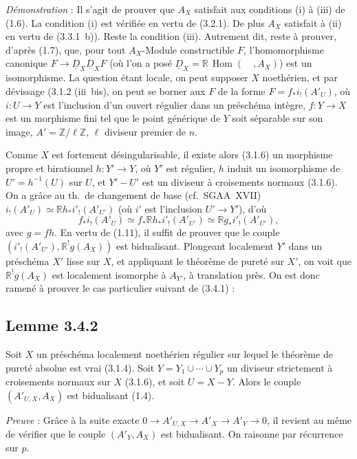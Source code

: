 \documentclass[11pt]{article}
\DeclareMathOperator{\Hom}{Hom}
\newcommand{\R}{\mathbb{R}}\newcommand{\RHomCore}{\mathbb{R}\mathrm{Hom}}
\newcommand{\Z}{\mathbb{Z}}
\providecommand{\Hom}{\operatorname{Hom}}
\providecommand{\R}{\mathrm R}
\providecommand{\Z}{\mathbb Z}
\providecommand{\Hom}{\operatorname{Hom}}
\begin{document}
\emph{Démonstration} : Il s'agit de prouver que $A_X$ satisfait aux conditions (i) à (iii) de (1.6). La condition (i) est vérifiée en vertu de (3.2.1). De plus $A_X$ satisfait à (ii) en vertu de (3.3.1~b)). Reste la condition (iii). Autrement dit, reste à prouver, d'après (1.7), que, pour tout $A_X$-Module constructible $F$, l'homomorphisme canonique $F \to \underline{D}_X \underline{D}_X F$ (où l'on a posé $\underline{D}_X = \R\,\Hom(\quad, A_X)$) est un isomorphisme. La question étant locale, on peut supposer $X$ noethérien, et par dévissage (3.1.2 (iii~bis), on peut se borner aux $F$ de la forme $F = f_{*}i_{!}(A'_U)$, où $i : U \to Y$ est l'inclusion d'un ouvert régulier dans un préschéma intègre, $f : Y \to X$ est un morphisme fini tel que le point générique de $Y$ soit séparable sur son image, $A' = \Z/\ell\Z$, $\ell$ diviseur premier de $n$.

Comme $X$ est fortement désingularisable, il existe alors (3.1.6) un morphisme propre et birationnel $h : Y' \to Y$, où $Y'$ est régulier, $h$ induit un isomorphisme de $U' = h^{-1}(U)$ sur $U$, et $Y' - U'$ est un diviseur à croisements normaux (3.1.6). On a grâce au th.~de changement de base (cf.~SGAA~XVII) $i_{!}(A'_U) \simeq \R h_{*} i'_{!}(A'_{U'})$ (où $i'$ est l'inclusion $U' \to Y'$), d'où
\[
f_{*} i_{!}(A'_U) \simeq f_{*} \R h_{*} i'_{!}(A'_{U'}) \simeq \R g_{*} i'_{!}(A'_{U'}),
\]
avec $g = fh$. En vertu de (1.11), il suffit de prouver que le couple 
$(i'_{!}(A'_{U'}), \R^{!}g(A_X))$ est
bidualisant. Plongeant localement $Y'$ dans un préschéma $X'$ lisse sur $X$, et appliquant le théorème de pureté sur $X'$, on voit que $\R^{!}g(A_X)$ est localement isomorphe à $A_{Y'}$, à translation près. On est donc ramené à prouver le cas particulier suivant de (3.4.1) :

\subsection*{Lemme 3.4.2}
Soit $X$ un préschéma localement noethérien régulier sur lequel le théorème de pureté absolue est vrai (3.1.4). Soit $Y = Y_1 \cup \cdots \cup Y_p$ un diviseur strictement à croisements normaux sur $X$ (3.1.6), et soit $U = X - Y$. Alors le couple $(A'_{U,X}, A_X)$ est bidualisant (1.4).

\emph{Preuve} : Grâce à la suite exacte $0 \to A'_{U,X} \to A'_X \to A'_Y \to 0$, il revient au même de vérifier que le couple $(A'_Y, A_X)$ est bidualisant. On raisonne par récurrence sur $p$.
\end{document}
